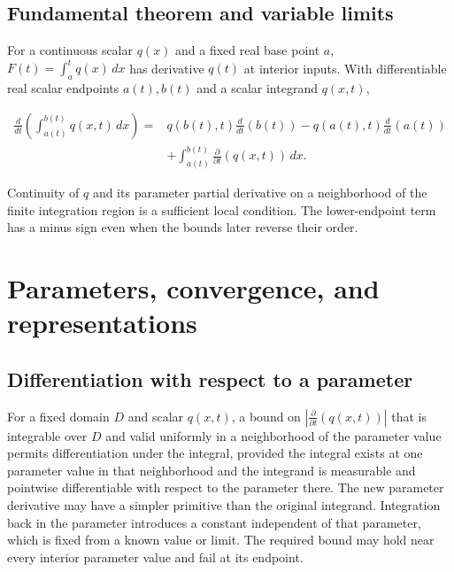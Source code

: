 \documentclass[11pt,oneside,openany]{book}
\begin{document}
\par\addvspace{8pt}\noindent\begin{minipage}{\linewidth}
\subsection{Fundamental theorem and variable limits}

For a continuous scalar \(q(x)\) and a fixed real base point \(a\),
\(F(t)=\int_a^t q(x)\,dx\) has derivative \(q(t)\) at interior inputs. With
differentiable real scalar endpoints \(a(t),b(t)\) and a scalar integrand \(q(x,t)\),

\[
\begin{aligned}
\frac{d}{dt}\left(\int_{a(t)}^{b(t)}q(x,t)\,dx\right)
={}&q(b(t),t)\frac{d}{dt}(b(t))
-q(a(t),t)\frac{d}{dt}(a(t))\\
&+\int_{a(t)}^{b(t)}\frac{\partial}{\partial t}\left(q(x,t)\right)\,dx.
\end{aligned}
\]

Continuity of \(q\) and its parameter partial derivative on a neighborhood of the
finite integration region is a sufficient local condition. The lower-endpoint
term has a minus sign even when the bounds later reverse their order.

\end{minipage}\par
\par\addvspace{8pt}\noindent\begin{minipage}{\linewidth}
\section{Parameters, convergence, and representations}

\subsection{Differentiation with respect to a parameter}

For a fixed domain \(D\) and scalar \(q(x,t)\), a bound on
\(|\frac{\partial}{\partial t}(q(x,t))|\) that is integrable over \(D\) and valid
uniformly in a neighborhood of the parameter value permits differentiation
under the integral, provided the integral exists at one parameter value in
that neighborhood and the integrand is measurable and pointwise differentiable
with respect to the parameter there.
The new parameter derivative may have a simpler primitive than the original
integrand. Integration back in the parameter introduces a constant independent
of that parameter, which is fixed from a known value or limit. The required
bound may hold near every interior parameter value and fail at its endpoint.

\end{minipage}\par
\end{document}
